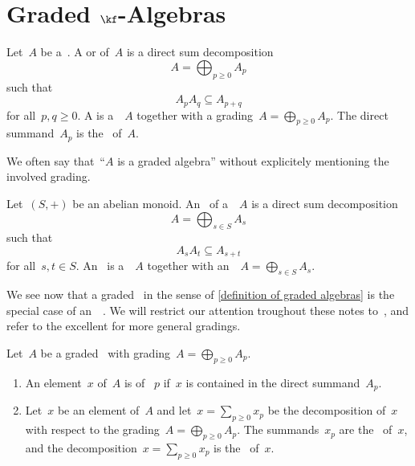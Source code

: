 \section{Graded \texorpdfstring{$\kf$}{k}-Algebras}


\begin{definition}
	\label{definition of graded algebras}
	Let~$A$ be a~\algebra{$\kf$}.
	A  or  of~$A$ is a direct sum decomposition
	\[
		A
		=
		\bigoplus_{p \geq 0} A_p
	\]
	such that
	\[
		A_p A_q
		\subseteq
		A_{p+q}
	\]
	for all~$p, q \geq 0$.
	A  is a~\algebra{$\kf$}~$A$ together with a grading~$A = \bigoplus_{p \geq 0} A_p$.
	The direct summand~$A_p$ is the~  of~$A$.
\end{definition}


\begin{remark}
	We often say that~\enquote{$A$ is a graded algebra} without explicitely mentioning the involved grading.
\end{remark}


\begin{remark}
	Let~$(S, +)$ be an abelian monoid.
	An~ of a~\algebra{$\kf$}~$A$ is a direct sum decomposition
	\[
		A
		=
		\bigoplus_{s \in S}
		A_s
	\]
	such that
	\[
		A_s A_t
		\subseteq
		A_{s + t}
	\]
	for all~$s, t \in S$.
	An~ is a~\algebra{$\kf$}~$A$ together with an~~$A = \bigoplus_{s \in S} A_s$.

	We see now that a graded~\algebra{$\kf$} in the sense of \cref{definition of graded algebras} is the special case of an~\graded{$\Natural$}~\algebra{$\kf$}.
	We will restrict our attention troughout these notes to~{\gradings{$\Natural$}}, and refer to the excellent \cite[II.{\S}11, III.{\S}3]{bourbaki_algebra_1} for more general gradings.
\end{remark}


\begin{definition}
	Let~$A$ be a graded~{\algebra{$\kf$}} with grading~$A = \bigoplus_{p \geq 0} A_p$.
	\begin{enumerate}
		\item
			An element~$x$ of~$A$ is  of ~$p$ if~$x$ is contained in the direct summand~$A_p$.
		\item
			Let~$x$ be an element of~$A$ and let~$x = \sum_{p \geq 0} x_p$ be the decomposition of~$x$ with respect to the grading~$A = \bigoplus_{p \geq 0} A_p$.
			The summands~$x_p$ are the~ of~$x$, and the decomposition~$x = \sum_{p \geq 0} x_p$ is the~ of~$x$.
	\end{enumerate}
\end{definition}


